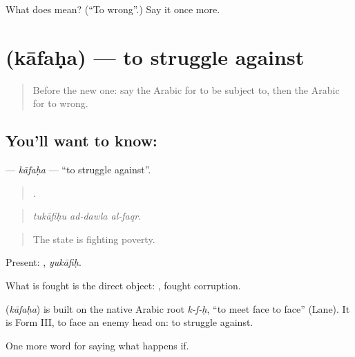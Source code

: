\begin{tcolorbox}[breakable,colback=teal!4,colframe=teal!35!black,title={Before you move on}]
What does  mean? (\textquotedblleft{}To wrong\textquotedblright{}.) Say it once more.
\end{tcolorbox}
\section[\texorpdfstring{\ar{كافح} (kāfaḥa)}{كافح (kāfaḥa)}]{ (kāfaḥa) — to struggle against}

\label{lesson:AR-C411-kafaha}



\begin{quote}
Before the new one: say the Arabic for to be subject to, then the Arabic for to wrong.
\end{quote}

\subsection*{You'll want to know: }
\textbf{} — \emph{kāfaḥa} — \textquotedblleft{}to struggle against\textquotedblright{}.

\begin{quote}
  .
\end{quote}

\begin{quote}
\emph{tukāfiḥu ad-dawla al-faqr.}
\end{quote}

\begin{quote}
The state is fighting poverty.
\end{quote}

Present: , \emph{yukāfiḥ}.

What is fought is the direct object:  , fought corruption.

\begin{cousinweb}
\textbf{} (\emph{kāfaḥa}) is built on the native Arabic root \emph{k-f-ḥ}, \textquotedblleft{}to meet face to face\textquotedblright{} (Lane). It is Form III, to face an enemy head on: to struggle against.
\end{cousinweb}

\begin{grammarlens}[title={What you've built}]
One more word for saying what happens if.
\end{grammarlens}

